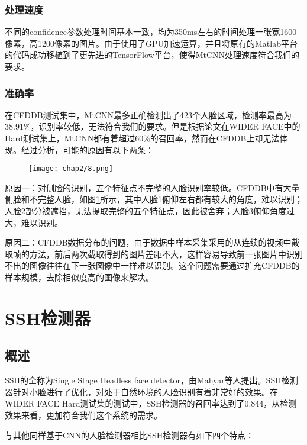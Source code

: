 \subsubsection{处理速度}

不同的confidence参数处理时间基本一致，均为350ms左右的时间处理一张宽1600像素，高1200像素的图片。由于使用了GPU加速运算，并且将原有的Matlab平台的代码成功移植到了更先进的TensorFlow平台，使得MtCNN处理速度符合我们的要求。

\subsubsection{准确率}

在CFDDB测试集中，MtCNN最多正确检测出了423个人脸区域，检测率最高为$38.91\%$，识别率较低，无法符合我们的要求。但是根据论文\parencite{zhang2016joint}在WIDER FACE中的Hard测试集上，MtCNN都有着超过$60\%$的召回率，然而在CFDDB上却无法体现。经过分析，可能的原因有以下两条：

\begin{figure}[!htp]
	\centering
	\texttt{[image: chap2/8.png]}
	\label{fig:mtcnn:accr}
\end{figure}


原因一：对侧脸的识别，五个特征点不完整的人脸识别率较低。CFDDB中有大量侧脸和不完整人脸，如图\ref{fig:mtcnn:accr}所示，其中人脸1俯仰左右都有较大的角度，难以识别；人脸2部分被遮挡，无法提取完整的五个特征点，因此被舍弃；人脸3俯仰角度过大，难以识别。


原因二：CFDDB数据分布的问题，由于数据中样本采集采用的从连续的视频中截取帧的方法，前后两次截取得到的图片差距不大，这样容易导致前一张图片中识别不出的图像往往在下一张图像中一样难以识别。这个问题需要通过扩充CFDDB的样本规模，去除相似度高的图像来解决。

\section{SSH检测器}

\subsection{概述}
SSH的全称为Single Stage Headless face detector\cite{najibi2017ssh}，由Mahyar等人提出。SSH检测器针对小脸进行了优化，对处于自然环境的人脸识别有着非常好的效果。在WIDER FACE Hard测试集的测试中，SSH检测器的召回率达到了0.844，从检测效果来看，更加符合我们这个系统的需求。

与其他同样基于CNN的人脸检测器相比SSH检测器有如下四个特点：

